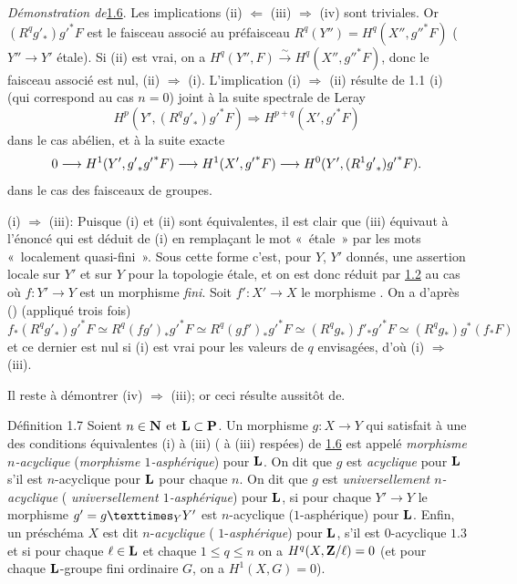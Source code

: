 \documentclass[10pt]{../fichiers-configuration-latex/smfart}
\begin{document}
\noindent
\emph{Démonstration de}\pageoriginale \hyperref[XV.prop1.6]{1.6}. Les implications (ii)
$\Leftarrow$ (iii) 
$\Rightarrow$ (iv) sont triviales.
Or $(R^{q}{g'}_{\ast}){g'}^{\ast}F$
est le faisceau associé au préfaisceau
$R^{q}(Y'')=H^{q}(X'',{g''}^{\ast}F)$ ($Y''\rightarrow Y'$ étale). Si
(ii) est vrai, on a $H^{q}(Y'',F)\xrightarrow{\sim}
H^{q}(X'',{g''}^{\ast}F)$, donc le faisceau associé est nul, \ie (ii) $\Rightarrow$ (i). L'implication (i) $\Rightarrow$ (ii) résulte de 1.1
(i) (qui correspond au cas $n=0$) joint à la suite spectrale de Leray
$$
H^{p}(Y',(R^{q}{g'}_{\ast}){g'}^{\ast}F)\Longrightarrow
H^{p+q}(X',{g'}^{\ast}F)
$$
dans le cas abélien, et à la suite exacte
$$
0\longrightarrow H^{1}(Y',{g'}_{\ast}{g'}^{\ast}F)\longrightarrow
H^{1}(X',{g'}^{\ast}F)\longrightarrow
H^{0}(Y',(R^{1}{g'}_{\ast}){g'}^{\ast}F){}.
$$
dans le cas des faisceaux de groupes.

(i) $\Rightarrow$ (iii): Puisque (i) et (ii) sont équivalentes, il est
clair que (iii) équivaut à l'énoncé qui est déduit de (i) en remplaçant
le mot « étale »  par les mots « localement quasi-fini ». Sous cette forme c'est, pour $Y$, $Y'$ donnés, une assertion
locale sur $Y'$ et sur $Y$ pour la topologie étale, et on est donc
réduit par \hyperref[XV.lem1.2]{1.2} au cas où $f:Y'\rightarrow Y$ est un morphisme
\emph{fini}. Soit $f':X'\rightarrow X$ le morphisme
.
On a d'après  (\resp {}) (appliqué trois fois)
$$
f_{\ast}(R^{q}{g'}_{\ast}){g'}^{\ast}F\simeq
R^{q}(fg')_{\ast}{g'}^{\ast}F\simeq
R^{q}(gf')_{\ast}{g'}^{\ast}F\simeq
(R^{q}g_{\ast}){f'}_{\ast}{g'}^{\ast}F\simeq
(R^{q}g_{\ast})g^{\ast}(f_{\ast}F)
$$
et ce dernier est nul si (i) est vrai pour les valeurs de $q$
envisagées, d'où (i) $\Rightarrow$ (iii).

Il reste à démontrer (iv) $\Rightarrow$ (iii); or ceci résulte
aussitôt de\pageoriginale {}.

\begin{enonce*}{Définition 1.7}
Soient $n\in \mathbf{N}$ et $\mathbf{L}\subset \mathbf{P}$. Un
morphisme $g:X\rightarrow Y$ qui satisfait à une des conditions
équivalentes {\rm(i)} à {\rm(iii)} ( à {\rm(iii)}
respées) de \hyperref[XV.prop1.6]{1.6} est appelé \emph{morphisme $n$-acyclique}
(\resp \emph{morphisme $1$-asphérique}) pour $\mathbf{L}$. On dit que $g$ est \emph{acyclique}
pour $\mathbf{L}$ s'il est $n$-acyclique pour $\mathbf{L}$ pour chaque
$n$. On dit que $g$ est \emph{universellement $n$-acyclique} (\resp
\emph{universellement $1$-asphérique}) pour $\mathbf{L}$, si pour
chaque $Y'\rightarrow Y$ le morphisme $g'=\fprod{g}{Y'}{Y}$ est
$n$-acyclique (\resp $1$-asphérique) pour $\mathbf{L}$. Enfin, un
préschéma $X$ est dit $n$-\emph{acyclique} (\resp
$1$-\emph{asphérique}) pour $\mathbf{L}$, s'il est $0$-acyclique $1.3$
et si pour chaque $\ell \in \mathbf{L}$ et chaque $1\leq q\leq n$ on a
$H^{q}(X,\mathbf{Z}/\ell)=0$ (\resp et pour chaque $\mathbf{L}$-groupe
fini ordinaire $G$, on a $H^{1}(X,G)=0$).
\end{enonce*}
\end{document}
